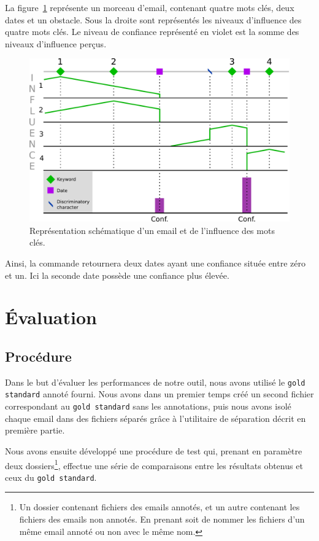 \documentclass[a4paper,french,10pt]{article}
\begin{document}
La figure~\ref{fig:representation_email} représente un morceau d'email, contenant quatre mots clés, deux dates et un obstacle. Sous la droite sont représentés les niveaux d'influence des quatre mots clés. Le niveau de confiance représenté en violet est la somme des niveaux d'influence perçus.

\begin{figure}[H]
\includegraphics[width=\textwidth]{files/representation_email}
\caption{Représentation schématique d'un email et de l'influence des mots clés.}
\label{fig:representation_email}
\end{figure}

Ainsi, la commande retournera deux dates ayant une confiance située entre zéro et un. Ici la seconde date possède une confiance plus élevée.

\section{Évaluation}

\subsection{Procédure}

Dans le but d'évaluer les performances de notre outil, nous avons utilisé le \texttt{gold standard} annoté fourni. Nous avons dans un premier temps créé un second fichier correspondant au  \texttt{gold standard} sans les annotations, puis nous avons isolé chaque email dans des fichiers séparés grâce à l'utilitaire de séparation décrit en première partie.

Nous avons ensuite développé une procédure de test qui, prenant en paramètre deux dossiers\footnote{Un dossier contenant fichiers des emails annotés, et un autre contenant les fichiers des emails non annotés. En prenant soit de nommer les fichiers d'un même email annoté ou non avec le même nom.}, effectue une série de comparaisons entre les résultats obtenus et ceux du \texttt{gold standard}.
\end{document}
